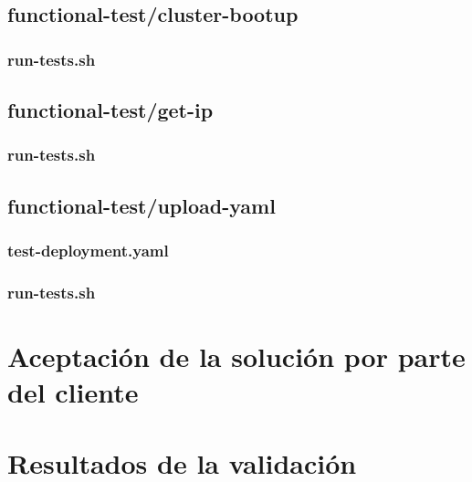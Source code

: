 \subsection{functional-test/cluster-bootup}
\noindent

\subsubsection{run-tests.sh}
\noindent




\subsection{functional-test/get-ip}
\noindent

\subsubsection{run-tests.sh}
\noindent





\subsection{functional-test/upload-yaml}

\subsubsection{test-deployment.yaml}
\noindent



\subsubsection{run-tests.sh}
\noindent




\section{Aceptación de la solución por parte del cliente}

\section{Resultados de la validación}


